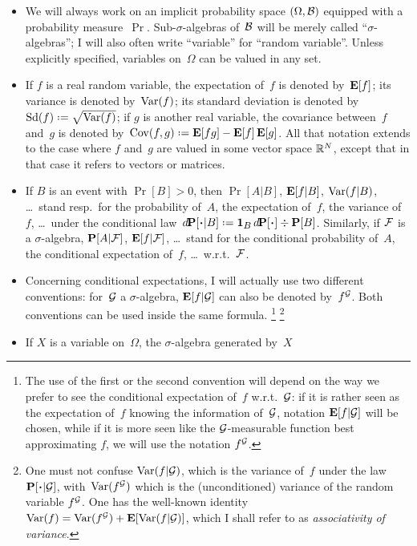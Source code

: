 \begin{itemize}
\item We will always work on an implicit probability space $(\Omega,\mathcal{B})$
equipped with a probability measure~$\Pr$. Sub-$\sigma$-algebras of~$\mathcal{B}$
will be merely called ``$\sigma$-algebras'';
I will also often write ``variable'' for ``random variable''.
Unless explicitly specified, variables on~$\Omega$ can be valued in any set.
%
\item If $f$ is a real random variable, the expectation of~$f$ is denoted by~$\mathop{\smash{\mathbf{E}}}\nolimits[f]$;
its variance is denoted by~$\operatorname{Var}(f)$; its standard deviation is denoted
by $\ecty(f) \coloneqq \sqrt{\Var(f)}$; if $g$ is another real variable,
the covariance between~$f$ and~$g$ is denoted by~$\Cov(f,g) \coloneqq \EE[fg] - \EE[f]\EE[g]$.
All that notation extends to the case where $f$ and~$g$ are valued
in some vector space $\mathbb{R}^N$, except that in that case it refers to vectors or matrices.
%
\item If $B$ is an event with $\Pr[B]>0$, then $\Pr[A|B]$, $\mathop{\smash{\mathbf{E}}}\nolimits[f|B]$, $\operatorname{Var}(f|B)$, \dots\ 
stand resp.\ for the probability of~$A$, the expectation of~$f$, the variance of~$f$, \dots\ 
under the conditional law~$\dx\Pr[\Bcdot|B] \coloneqq \1{B}\,\dx\Pr[\Bcdot] \div\Pr[B]$.
Similarly, if $\mathcal{F}$ is a $\sigma$-algebra,
$\mathop{\smash{\mathbf{P}}}\nolimits[A|\mathcal{F}]$, $\mathop{\smash{\mathbf{E}}}\nolimits[f|\mathcal{F}]$, \dots\ stand for the conditional probability of~$A$,
the conditional expectation of~$f$, \dots\ w.r.t.~$\mathcal{F}$.
%
\item Concerning conditional expectations, I will actually use two different conventions:
for~$\mathcal{G}$ a $\sigma$-algebra, $\mathop{\smash{\mathbf{E}}}\nolimits[f|\mathcal{G}]$ can also be denoted by~$f^{\mathcal{G}}$.
Both conventions can be used inside the same formula.%
\footnote{The use of the first or the second convention will depend on
the way we prefer to see the conditional expectation of~$f$ w.r.t.~$\mathcal{G}$:
if it is rather seen as the expectation of~$f$ knowing the information of~$\mathcal{G}$,
notation $\mathop{\smash{\mathbf{E}}}\nolimits[f|\mathcal{G}]$ will be chosen, while if it is more seen like
the $\mathcal{G}$-measurable function best approximating $f$, we will use the notation $f^{\mathcal{G}}$.}%
\footnote{One must not confuse $\operatorname{Var}(f|\mathcal{G})$,
which is the variance of~$f$ under the law $\Pr[\Bcdot|\mcal{G}]$,
with~$\operatorname{Var}(f^{\mathcal{G}})$ which is the (unconditioned) variance of the random variable $f^{\mathcal{G}}$.
One has the well-known identity $\operatorname{Var}(f) = \operatorname{Var}(f^{\mathcal{G}}) + \mathop{\smash{\mathbf{E}}}\nolimits[\operatorname{Var}(f|\mathcal{G})]$,
which I shall refer to as \emph{associativity of variance}.}
%
\item If $X$ is a variable on~$\Omega$, the $\sigma$-algebra generated by~$X$

\end{itemize}
